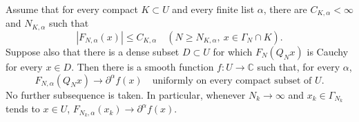\begin{theorem}\label{ex-smooth-grid-limit}
Assume that for every compact \(K\subset U\) and every finite list
\(\alpha\), there are \(C_{K,\alpha}<\infty\) and \(N_{K,\alpha}\)
such that
\begin{equation}\label{ex-grid-derivative-budget}
 |F_{N,\alpha}(x)|\le C_{K,\alpha}
 \quad(N\ge N_{K,\alpha},\ x\in\Gamma_N\cap K).
\end{equation}
Suppose also that there is a dense subset \(D\subset U\) for which
\(F_N(Q_Nx)\) is Cauchy for every \(x\in D\).
Then there is a smooth function \(f:U\to\mathbb C\) such that, for
every \(\alpha\),
\begin{equation}\label{ex-grid-all-limits}
 F_{N,\alpha}(Q_Nx)\longrightarrow\partial^\alpha f(x)
 \quad\text{uniformly on every compact subset of }U.
\end{equation}
No further subsequence is taken. In particular, whenever \(N_k\to\infty\)
and \(x_k\in\Gamma_{N_k}\) tends to \(x\in U\),
\(F_{N_k,\alpha}(x_k)\to\partial^\alpha f(x)\).
\end{theorem}
